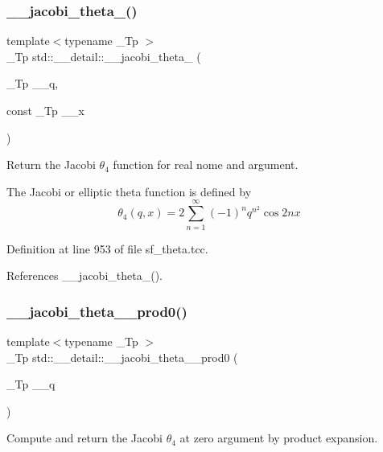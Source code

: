 \subsubsection{\texorpdfstring{\+\_\+\+\_\+jacobi\+\_\+theta\+\_()}{\_\_jacobi\_theta\_4()}\hspace{0.1cm}{\footnotesize\ttfamily [2/2]}}
{\footnotesize\ttfamily template$<$typename \+\_\+\+Tp $>$ \\
\+\_\+\+Tp std\+::\+\_\+\+\_\+detail\+::\+\_\+\+\_\+jacobi\+\_\+theta\+\_ (\begin{DoxyParamCaption}\item[{\+\_\+\+Tp}]{\+\_\+\+\_\+q,  }\item[{const \+\_\+\+Tp}]{\+\_\+\+\_\+x }\end{DoxyParamCaption})}

Return the Jacobi $ \theta_4 $ function for real nome and argument.

The Jacobi or elliptic theta function is defined by \[ \theta_4(q,x) = 2\sum_{n=1}^{\infty}(-1)^n q^{n^2}\cos{2nx} \] 

Definition at line 953 of file sf\+\_\+theta.\+tcc.



References \+\_\+\+\_\+jacobi\+\_\+theta\+\_().

\mbox{\label{namespacestd_1_1____detail_adf29970162f8a246fd081dba3b203779}} 
\subsubsection{\texorpdfstring{\+\_\+\+\_\+jacobi\+\_\+theta\+\_\+\_\+prod0()}{\_\_jacobi\_theta\_4\_prod0()}}
{\footnotesize\ttfamily template$<$typename \+\_\+\+Tp $>$ \\
\+\_\+\+Tp std\+::\+\_\+\+\_\+detail\+::\+\_\+\+\_\+jacobi\+\_\+theta\+\_\+\_\+prod0 (\begin{DoxyParamCaption}\item[{\+\_\+\+Tp}]{\+\_\+\+\_\+q }\end{DoxyParamCaption})}

Compute and return the Jacobi $ \theta_4 $ at zero argument by product expansion. 


